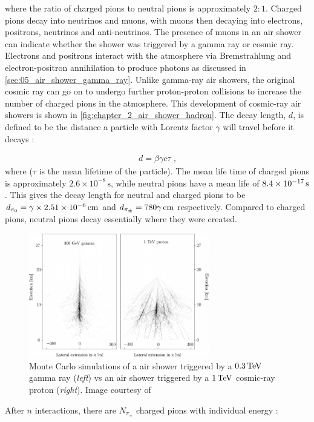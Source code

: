 \noindent where the ratio of charged pions to neutral pions is approximately $2:1$. Charged pions decay into neutrinos and muons, with muons then decaying into electrons, positrons, neutrinos and anti-neutrinos. The presence of muons in an air shower can indicate whether the shower was triggered by a gamma ray or cosmic ray. Electrons and positrons interact with the atmosphere via Bremstrahlung and electron-positron annihilation to produce photons as discussed in \autoref{sec:05_air_shower_gamma_ray}. Unlike gamma-ray air showers, the original cosmic ray can go on to undergo further proton-proton collisions to increase the number of charged pions in the atmosphere. This development of cosmic-ray air showers is shown in \autoref{fig:chapter_2_air_shower_hadron}.
\newpar
The decay length, $d$, is defined to be the distance a particle with Lorentz factor $\gamma$ will travel before it decays \citep{MATTHEWS2005387}:

\begin{equation}
    \begin{aligned}
    d=\beta \gamma c \tau \text{ ,}
    \end{aligned}
\end{equation}
\noindent where ($\tau$ is the mean lifetime of the particle). The mean life time of charged pions is approximately $2.6\times 10^{-8}\,\si{\second}$, while neutral pions have a mean life of $8.4\times 10^{-17}\,\si{\second}$. This gives the decay length for neutral and charged pions to be $d_{\pi_0}=\gamma \times  2.51 \times 10^{-6}\,\si{\centi\meter}$ and $d_{\pi_\pm}= 780\gamma\,\si{\centi\meter}$ respectively. Compared to charged pions, neutral pions decay essentially where they were created.
\begin{figure}
    \centering
    \includegraphics[width=0.7\textwidth]{05_Astronomy/Images/air_shower/cosmic_ray_vs_gamma_ray2.pdf}
    \caption{Monte Carlo simulations of a air shower triggered by a $0.3\,\TeV$ gamma ray (\textit{left}) vs an air shower triggered by a $1\,\TeV$ cosmic-ray proton (\textit{right}). Image courtesy of \cite{2008RPPh...71i6901A}}
    \label{fig:chapter_2_air_shower2}
\end{figure}
\newpar 
After $n$ interactions, there are $N_{\pi_\pm}$ charged pions with individual energy \citep{MATTHEWS2005387}:

